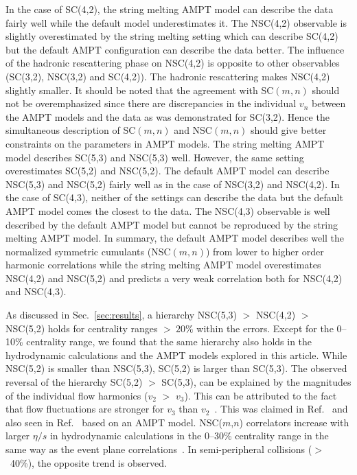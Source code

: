 In the case of SC(4,2), the string melting AMPT model can describe the data fairly well while the default model underestimates it.
The NSC(4,2) observable is slightly overestimated by the string melting setting which can describe SC(4,2) but the default AMPT configuration can describe the data better.
The influence of the hadronic rescattering phase on NSC(4,2) is opposite to other observables (SC(3,2), NSC(3,2) and SC(4,2)). The hadronic rescattering makes NSC(4,2) slightly smaller.
It should be noted that the agreement with SC$(m,n)$ should not be overemphasized since there are discrepancies in the individual $v_n$ between the AMPT models and the data as was demonstrated for SC(3,2).
Hence the simultaneous description of SC$(m,n)$ and NSC$(m,n)$ should give better constraints on the parameters in AMPT models.
The string melting AMPT model describes SC(5,3) and NSC(5,3) well. However, the same setting overestimates SC(5,2) and NSC(5,2). 
The default AMPT model can describe NSC(5,3) and NSC(5,2) fairly well as in the case of NSC(3,2) and NSC(4,2).
In the case of SC(4,3), neither of the settings can describe the data but the default AMPT model comes the closest to the data. 
The NSC(4,3) observable is well described by the default AMPT model but cannot be reproduced by the string melting AMPT model.
In summary, the default AMPT model describes well the normalized symmetric cumulants (NSC$(m,n)$) from lower to higher order harmonic correlations while the string melting AMPT model overestimates NSC(4,2) and NSC(5,2) and predicts a very weak correlation both for NSC(4,2) and NSC(4,3). 

As discussed in Sec.~\ref{sec:results}, a hierarchy NSC(5,3) $>$ NSC(4,2) $>$ NSC(5,2) holds for centrality ranges $>~20\%$ within the errors.
Except for the 0--10\% centrality range, we found that the same hierarchy also holds in the hydrodynamic calculations and the AMPT models explored in this article.
While NSC(5,2) is smaller than NSC(5,3), SC(5,2) is larger than SC(5,3).
The observed reversal of the hierarchy SC(5,2) $>$ SC(5,3), can be explained by the magnitudes of the individual flow harmonics ($v_2$ $>$ $v_3$). 
This can be attributed to the fact that flow fluctuations are stronger for $v_3$ than $v_2$~\cite{Aad:2013xma}. This was claimed in Ref.~\cite{Zhu:2016puf} and also seen in Ref.~\cite{Bhalerao:2014xra} based on an AMPT model. 
NSC($m$,$n$) correlators increase with larger $\eta/s$ in hydrodynamic calculations in the 0--30\% centrality range in the same way as the event plane correlations~\cite{Bhalerao:2013ina,Teaney:2013dta}. In semi-peripheral collisions ($>$~40\%), the opposite trend is observed.

